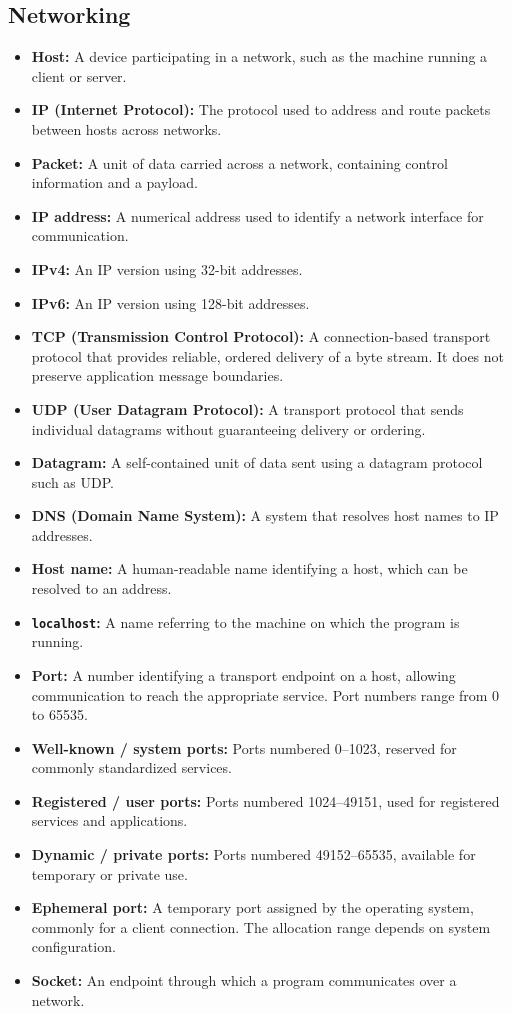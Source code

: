 \documentclass[11pt]{article}
\newenvironment{DottedList}{%
  \begin{itemize}[leftmargin=2em, itemsep=0.35em, topsep=0.35em, label=\textbullet]
}{%
  \end{itemize}
}
\begin{document}
\subsection*{Networking}
\begin{DottedList}
  \item \textbf{Host:} A device participating in a network, such as the machine running a client or server.
  \item \textbf{IP (Internet Protocol):} The protocol used to address and route packets between hosts across networks.
  \item \textbf{Packet:} A unit of data carried across a network, containing control information and a payload.
  \item \textbf{IP address:} A numerical address used to identify a network interface for communication.
  \item \textbf{IPv4:} An IP version using 32-bit addresses.
  \item \textbf{IPv6:} An IP version using 128-bit addresses.
  \item \textbf{TCP (Transmission Control Protocol):} A connection-based transport protocol that provides reliable, ordered delivery of a byte stream. It does not preserve application message boundaries.
  \item \textbf{UDP (User Datagram Protocol):} A transport protocol that sends individual datagrams without guaranteeing delivery or ordering.
  \item \textbf{Datagram:} A self-contained unit of data sent using a datagram protocol such as UDP.
  \item \textbf{DNS (Domain Name System):} A system that resolves host names to IP addresses.
  \item \textbf{Host name:} A human-readable name identifying a host, which can be resolved to an address.
  \item \textbf{\texttt{localhost}:} A name referring to the machine on which the program is running.
  \item \textbf{Port:} A number identifying a transport endpoint on a host, allowing communication to reach the appropriate service. Port numbers range from 0 to 65535.
  \item \textbf{Well-known / system ports:} Ports numbered 0--1023, reserved for commonly standardized services.
  \item \textbf{Registered / user ports:} Ports numbered 1024--49151, used for registered services and applications.
  \item \textbf{Dynamic / private ports:} Ports numbered 49152--65535, available for temporary or private use.
  \item \textbf{Ephemeral port:} A temporary port assigned by the operating system, commonly for a client connection. The allocation range depends on system configuration.
  \item \textbf{Socket:} An endpoint through which a program communicates over a network.
\end{DottedList}
\end{document}
